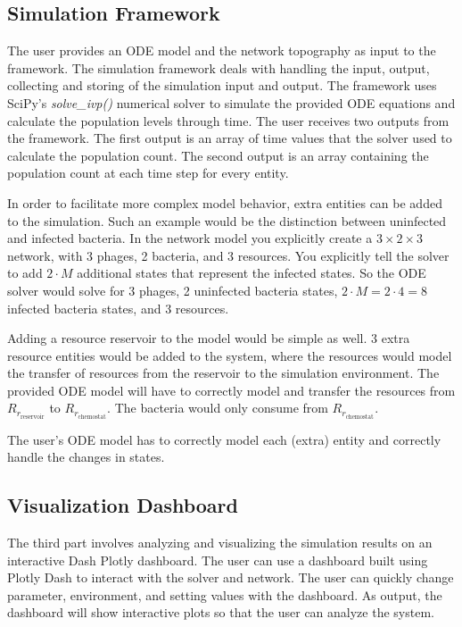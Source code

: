 \subsection{Simulation Framework} %
\label{sec:simulation_framework}
The user provides an ODE model and the network topography as input to the framework. 
The simulation framework deals with handling the input, output, collecting and storing of the simulation input and output.
The framework uses SciPy's \cite{virtanenSciPy10Fundamental2020} \textit{solve\_ivp()} numerical solver \cite{ dormandFamilyEmbeddedRungeKutta1980} to simulate the provided ODE equations and calculate the population levels through time.
The user receives two outputs from the framework. 
The first output is an array of time values that the solver used to calculate the population count.
The second output is an array containing the population count at each time step for every entity.

In order to facilitate more complex model behavior, extra entities can be added to the simulation.  
Such an example would be the distinction between uninfected and infected bacteria. 
In the network model you explicitly create a $3\times 2 \times 3$ network, with 3 phages, 2 bacteria, and 3 resources. 
You explicitly tell the solver to add $2\cdot M$ additional states that represent the infected states. 
So the ODE solver would solve for 3 phages, 2 uninfected bacteria states, $2\cdot M = 2\cdot 4=8$ infected bacteria states, and 3 resources. 

Adding a resource reservoir to the model would be simple as well. 
3 extra resource entities would be added to the system, where the resources would model the transfer of resources from the reservoir to the simulation environment. 
The provided ODE model will have to correctly model and transfer the resources from $R_{r_{\text{reservoir}}}$ to $R_{r_{\text{chemostat}}}$. 
The bacteria would only consume from $R_{r_{\text{chemostat}}}$. 

The user's ODE model has to correctly model each (extra) entity and correctly handle the changes in states. 

\subsection{Visualization Dashboard}
\label{sec:visualization_framework}
The third part involves analyzing and visualizing the simulation results on an interactive Dash Plotly \cite{DashDocumentationUser} dashboard. 
The user can use a dashboard built using Plotly Dash to interact with the solver and network.
The user can quickly change parameter, environment, and setting values with the dashboard. 
As output, the dashboard will show interactive plots so that the user can analyze the system. 

